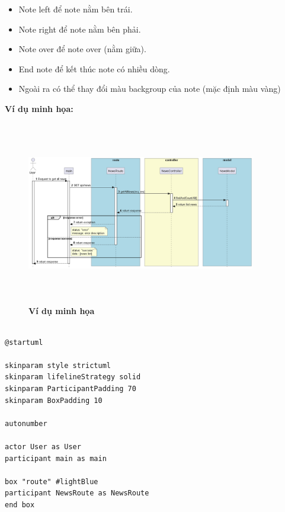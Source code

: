 \begin{enumerate}[a)]
  
\begin{adjustwidth}{2em}{}
  \begin{itemize}

    \item Note left để note nằm bên trái.
    \item Note right để note nằm bên phải.
    \item Note over để note over (nằm giữa).
    \item End note để kết thúc note có nhiều dòng.
    \item	Ngoài ra có thể thay đổi màu backgroup của note (mặc định màu vàng)
    
    
  \end{itemize}
  \end{adjustwidth}

  \textbf{Ví dụ minh họa:}

  \begin{figure}[H]
    \centering
    \includegraphics[width=10cm,height=8cm]{Images/server/sequence/server/getAllNews.png}
    \caption[Ví dụ minh họa]{\bfseries \fontsize{12pt}{0pt}
    \selectfont Ví dụ minh họa}
    \label{plantuml_object} %
  \end{figure}



\begin{lstlisting}

@startuml

skinparam style strictuml
skinparam lifelineStrategy solid
skinparam ParticipantPadding 70
skinparam BoxPadding 10

autonumber

actor User as User
participant main as main

box "route" #lightBlue
participant NewsRoute as NewsRoute
end box


\end{lstlisting}
\end{enumerate}
